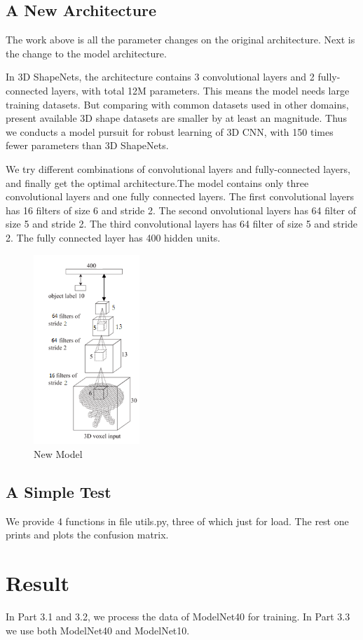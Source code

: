 \documentclass[11pt,journal,compsoc]{IEEEtran}
\begin{document}
  \subsection{A New Architecture}
  The work above is all the parameter changes on the original architecture. Next is the change to the model architecture.

  In 3D ShapeNets, the architecture contains 3 convolutional layers and 2 fully-connected layers, with total 12M parameters. This means the model needs large training datasets. But comparing with common datasets used in other domains, present available 3D shape datasets are smaller by at least an magnitude. Thus we conducts a model pursuit for robust learning of 3D CNN, with 150 times fewer parameters than 3D ShapeNets.
  
  We try different combinations of convolutional layers and fully-connected layers, and finally get the optimal architecture.The model contains only three convolutional layers and one fully connected layers. The first convolutional layers has 16 filters of size 6 and stride 2. The second onvolutional layers has 64 filter of size 5 and stride 2. The third convolutional layers has 64 filter of size 5 and stride 2. The fully connected layer has 400 hidden units. 
  \begin{figure}[ht]
    \centering
    \includegraphics[width=4cm]{pic/arch3.png}
    \caption{New Model}
    \label{figure:label}
  \end{figure}
  \subsection{A Simple Test}
  We provide 4 functions in file utils.py, three of which just for load. The rest one prints and plots the confusion matrix.

  \section{Result}
  In Part 3.1 and 3.2, we process the data of ModelNet40 for training. In Part 3.3 we use both ModelNet40 and ModelNet10.
\end{document}
